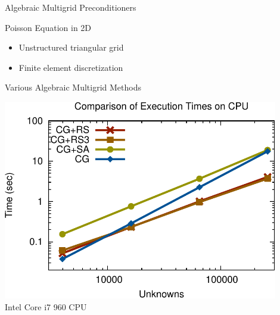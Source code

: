 

\begin{frame}{Algebraic Multigrid Preconditioners}

  \begin{block}{Poisson Equation in 2D}
    \begin{itemize}
     \item Unstructured triangular grid
     \item Finite element discretization
    \end{itemize}
  \end{block}

 \begin{block}{Various Algebraic Multigrid Methods}
  \vspace*{0.3cm}
  \begin{minipage}{0.48\textwidth}
  \begin{center}
   \includegraphics[width=0.9\textwidth]{figures/cpu_scaling-2.pdf}\\
   Intel Core i7 960 CPU
  \end{center}
  \end{minipage}
  \begin{minipage}{0.48\textwidth}
  \begin{center}
  \end{center}
  \end{minipage}
 \end{block}

  \vspace*{0.6cm}

\end{frame}

